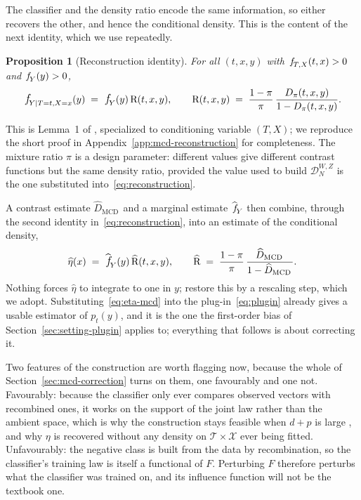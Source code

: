 \documentclass[11pt]{article}
\theoremstyle{plain}
\newtheorem{mypropo}{Proposition}
\theoremstyle{definition}
\theoremstyle{remark}
\newcommand{\mcd}{\text{MCD}\,}
\newcommand{\cX}{\ensuremath{\mathcal{X}}}
\newcommand{\cT}{\ensuremath{\mathcal{T}}}
\newcommand{\pf}[1]{\ensuremath{\,\mathlarger{\textit{f}}_{#1}}}
\newcommand{\pfhat}[1]{\ensuremath{\,\mathlarger{\widehat{\textit{f}}}_{#1}}}
\newcommand{\ratio}{\ensuremath{\pi}}
\newcommand{\contrast}{D_{\ratio}}
\newcommand{\contrasthat}{\widehat{D}_{\mcd}}
\newcommand{\DensityRatio}{\text{R}}
\newcommand{\mDwz}[1]{\ensuremath{\mathcal{D}}_{#1}^{W,Z}}
\begin{document}
The classifier and the density ratio encode the same information, so either recovers the
other, and hence the conditional density. This is the content of the next identity, which we
use repeatedly.

\begin{mypropo}[Reconstruction identity]
\label{prop:reconstruction}
For all $(t,x,y)$ with $\pf{T,X}(t,x) > 0$ and $\pf{Y}(y) > 0$,
\begin{equation}
\pf{Y \mid T=t,X=x}(y) \;=\; \pf{Y}(y)\,\DensityRatio(t,x,y),
\qquad
\DensityRatio(t,x,y) \;=\; \frac{1-\ratio}{\ratio}\,
\frac{\contrast(t,x,y)}{1-\contrast(t,x,y)} .
\label{eq:reconstruction}
\end{equation}
\end{mypropo}

This is Lemma~1 of \citet{meziani2025mcd}, specialized to conditioning variable $(T,X)$; we
reproduce the short proof in Appendix~\ref{app:mcd-reconstruction} for completeness. The
mixture ratio $\ratio$ is a design parameter: different values give different contrast
functions but the same density ratio, provided the value used to build $\mDwz{N}$ is the one
substituted into~\eqref{eq:reconstruction}.

A contrast estimate $\contrasthat$ and a marginal estimate $\pfhat{Y}$ then combine, through
the second identity in~\eqref{eq:reconstruction}, into an estimate of the conditional density,
\begin{equation}
\widehat\eta(x) \;=\; \pfhat{Y}(y)\,\widehat{\DensityRatio}(t,x,y),
\qquad
\widehat{\DensityRatio} \;=\; \frac{1-\ratio}{\ratio}\,
\frac{\contrasthat}{1-\contrasthat} .
\label{eq:eta-mcd}
\end{equation}
Nothing forces $\widehat\eta$ to integrate to one in $y$; \citet{meziani2025mcd} restore this
by a rescaling step, which we adopt. Substituting~\eqref{eq:eta-mcd} into the
plug-in~\eqref{eq:plugin} already gives a usable estimator of $p_t(y)$, and it is the one the
first-order bias of Section~\ref{sec:setting-plugin} applies to; everything that follows is
about correcting it.

Two features of the construction are worth flagging now, because the whole of
Section~\ref{sec:mcd-correction} turns on them, one favourably and one not. Favourably: because
the classifier only ever compares observed vectors with recombined ones, it works on the
support of the joint law rather than the ambient space, which is why the construction stays
feasible when $d+p$ is large \citep{meziani2025mcd}, and why $\eta$ is recovered without any
density on $\cT\times\cX$ ever being fitted. Unfavourably: the negative class is built from the
data by recombination, so the classifier's training law is itself a functional of $F$.
Perturbing $F$ therefore perturbs what the classifier was trained on, and its influence
function will not be the textbook one.
\end{document}
